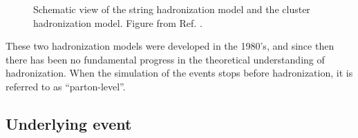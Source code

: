 \begin{figure}[h]
\begin{center}
\end{center}
 \caption{Schematic view of  the string hadronization model and  the cluster hadronization model. 
 Figure from Ref. \cite{Isildak:2013kfa}.}
  \label{fig:had_model}
\end{figure}


These two hadronization models were developed in the 1980's, and since then there has been no fundamental progress in the theoretical understanding of hadronization. 
When the simulation of the events stops before hadronization, it is referred to as ``parton-level''.

\subsection{Underlying event}

